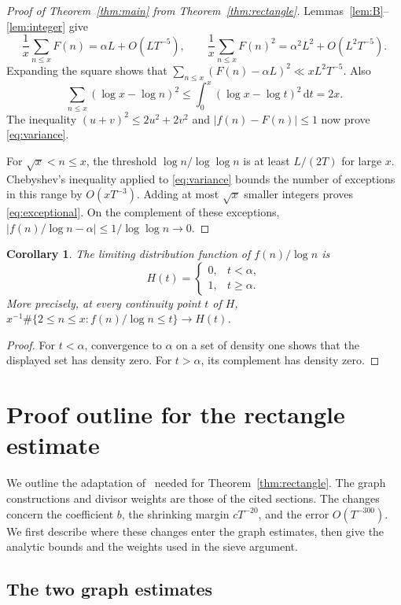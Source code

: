 \documentclass[10pt]{article}
\newtheorem{cor}[thm]{Corollary}
\newcommand{\dd}{\,\mathrm d}
\begin{document}
\begin{proof}[Proof of Theorem~\ref{thm:main} from Theorem~\ref{thm:rectangle}]
Lemmas~\ref{lem:B}--\ref{lem:integer} give
\[
 \frac1x\sum_{n\leq x}F(n)=\alpha L+O(LT^{-5}),\qquad
 \frac1x\sum_{n\leq x}F(n)^2=\alpha^2L^2+O(L^2T^{-5}).
\]
Expanding the square shows that $\sum_{n\leq x}(F(n)-\alpha L)^2\ll xL^2T^{-5}$. Also
\[
 \sum_{n\leq x}(\log x-\log n)^2
 \leq\int_0^x(\log x-\log t)^2\dd t=2x.
\]
The inequality $(u+v)^2\leq2u^2+2v^2$ and $|f(n)-F(n)|\leq1$ now prove \eqref{eq:variance}.

For $\sqrt{x}<n\leq x$, the threshold $\log n/\log\log n$ is at least $L/(2T)$ for large $x$. Chebyshev's inequality applied to \eqref{eq:variance} bounds the number of exceptions in this range by $O(xT^{-3})$. Adding at most $\sqrt{x}$ smaller integers proves \eqref{eq:exceptional}. On the complement of these exceptions, $|f(n)/\log n-\alpha|\leq1/\log\log n\to0$.
\end{proof}

\begin{cor}\label{cor:distribution}
The limiting distribution function of $f(n)/\log n$ is
\[
 H(t)=\begin{cases}0,&t<\alpha,\\1,&t\geq\alpha.
 \end{cases}
\]
More precisely, at every continuity point $t$ of $H$, $x^{-1}\#\{2\leq n\leq x:f(n)/\log n\leq t\}\to H(t)$.
\end{cor}
\begin{proof}
For $t<\alpha$, convergence to $\alpha$ on a set of density one shows that the displayed set has density zero. For $t>\alpha$, its complement has density zero.
\end{proof}

\section{Proof outline for the rectangle estimate}
\label{sec:extraction}

We outline the adaptation of~\cite[Sections~3--7]{PD} needed for Theorem~\ref{thm:rectangle}. The graph constructions and divisor weights are those of the cited sections. The changes concern the coefficient $b$, the shrinking margin $cT^{-20}$, and the error $O(T^{-300})$. We first describe where these changes enter the graph estimates, then give the analytic bounds and the weights used in the sieve argument.

\subsection{The two graph estimates}
\end{document}
